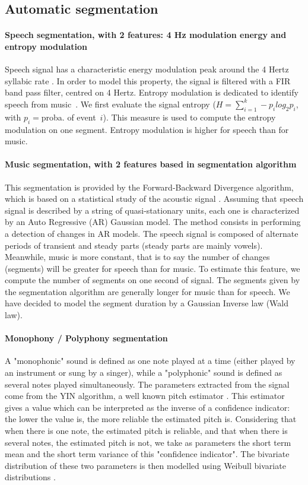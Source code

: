 \documentclass{sig-alternate}
\begin{document}
\subsection{Automatic segmentation}

\paragraph{Speech segmentation, with 2 features: 4 Hz modulation energy and entropy modulation} 
Speech signal has a characteristic energy modulation peak around the 4 Hertz syllabic rate \cite{Houtgast1985}. In order to model this property, the signal is filtered with a FIR band pass filter, centred on 4 Hertz.
Entropy modulation is dedicated to identify speech from music~\cite{Pinquier2003}. We first evaluate the signal entropy ($H=\sum_{i=1}^{k}-p_ilog_2p_i$, with $p_i=$proba. of event~$i$). This measure is used to compute the entropy modulation on one segment. Entropy modulation is higher for speech than for music.

\paragraph{Music segmentation, with 2 features based in segmentation algorithm} 
This segmentation is provided by the Forward-Backward Divergence algorithm, which is based on a statistical study of the acoustic signal \cite{Obrecht1988}. Assuming that speech signal is described by a string of quasi-stationary units, each one is characterized by an Auto Regressive (AR) Gaussian model. The method consists in performing a detection of changes in AR models. 
The speech signal is composed of alternate periods of transient and steady parts (steady parts are mainly vowels). Meanwhile, music is more constant, that is to say the number of changes (segments) will be greater for speech than for music. To estimate this feature, we compute the number of segments on one second of signal. 
The segments given by the segmentation algorithm are generally longer for music than for speech. We have decided to model the segment duration by a Gaussian Inverse law (Wald law).

\paragraph{Monophony / Polyphony segmentation}
A "monophonic" sound is defined as one note played at a time (either played by an instrument or sung by a singer), while a "polyphonic" sound is defined as several notes played simultaneously. The parameters extracted from the signal come from the YIN algorithm, a well known pitch estimator \cite{DeCheveigne2002}. This estimator gives a value which can be interpreted as the inverse of a confidence indicator: the lower the value is, the more reliable the estimated pitch is. Considering that when there is one note, the estimated pitch is reliable, and that when there is several notes, the estimated pitch is not, we take as parameters the short term mean and the short term variance of this "confidence indicator". The bivariate distribution of these two parameters is then modelled using Weibull bivariate distributions \cite{Lachambre2011}.
\end{document}
